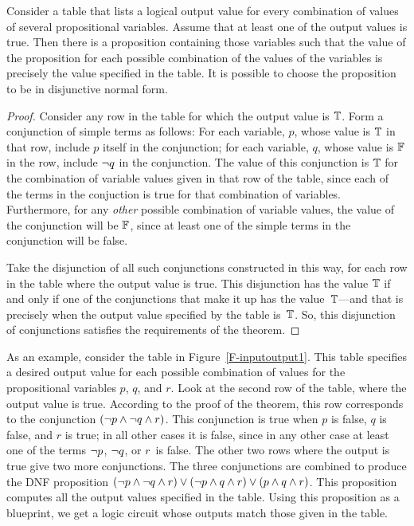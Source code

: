 \begin{theorem}\label{T-DNF}
Consider a table that lists a logical output value for every
combination of values of several propositional variables.
Assume that at least one of the output values is true.
Then there is a proposition containing those variables such that
the value of the proposition for each possible combination of
the values of the variables is precisely the value specified
in the table.  It is possible to choose the proposition to
be in disjunctive normal form.
\end{theorem}
\begin{proof}
Consider any row in the table for which the output value is $\mathbb{T}$.
Form a conjunction of simple terms as follows: For each variable, $p$,
whose value is $\mathbb{T}$ in that row, include $p$ itself in the conjunction;
for each variable, $q$, whose value is $\mathbb{F}$ in the row, include
$\lnot q$ in the conjunction.  The value of this conjunction is
$\mathbb{T}$ for the combination of variable values given in that row
of the table, since each of the terms in the conjuction is true
for that combination of variables.  Furthermore, for any \emph{other}
possible combination of variable values, the value of the conjunction
will be $\mathbb{F}$, since at least one of the simple terms in the 
conjunction will be false.

Take the disjunction of all such conjunctions constructed in this
way, for each row in the table where the output value is true.
This disjunction has the value $\mathbb{T}$ if and only if one of
the conjunctions that make it up has the value~$\mathbb{T}$---and that is
precisely when the output value specified by the table is~$\mathbb{T}$.
So, this disjunction of conjunctions satisfies the requirements of
the theorem.
\end{proof} 

As an example, consider the table in Figure~\ref{F-inputoutput1}.
This table specifies a desired output value for each possible
combination of values for the propositional variables $p$,
$q$, and $r$.  Look at the second row of the table, where
the output value is true.  According to the proof of the theorem,
this row corresponds to the conjunction $(\lnot p\wedge\lnot q\wedge r)$.
This conjunction is true when $p$ is false, $q$ is false,
and $r$ is true; in all other cases it is false, since in any other
case at least one of the terms $\lnot p$, $\lnot q$, or $r$~is
false.  The other two rows where the output is true give
two more conjunctions.  The three conjunctions are combined
to produce the  DNF proposition $(\lnot p\wedge\lnot q\wedge r) \vee
(\lnot p\wedge q\wedge r) \vee (p\wedge q\wedge r)$.  This proposition
computes all the output values specified in the table.
Using this proposition as a blueprint, we get a logic circuit
whose outputs match those given in the table.

